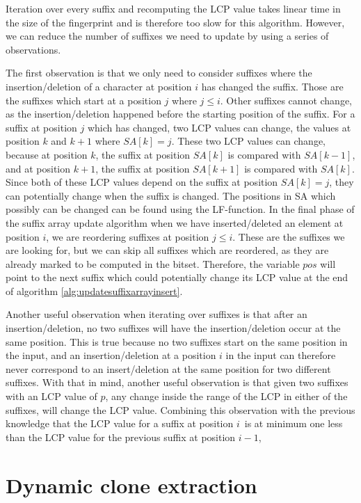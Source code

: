 Iteration over every suffix and recomputing the LCP value takes linear time in the size of
the fingerprint and is therefore too slow for this algorithm. However, we can reduce the
number of suffixes we need to update by using a series of observations.

The first observation is that we only need to consider suffixes where the
insertion/deletion of a character at position $i$ has changed the suffix. Those are the
suffixes which start at a position $j$ where $j \leq i$. Other suffixes cannot change, as
the insertion/deletion happened before the starting position of the suffix. For a suffix
at position $j$ which has changed, two LCP values can change, the values at position $k$
and $k + 1$ where $SA[k] = j$. These two LCP values can change, because at position $k$,
the suffix at position $SA[k]$ is compared with $SA[k - 1]$, and at position $k + 1$, the
suffix at position $SA[k + 1]$ is compared with $SA[k]$. Since both of these LCP values
depend on the suffix at position $SA[k] = j$, they can potentially change when the suffix
is changed. The positions in SA which possibly can be changed can be found using the
LF-function. In the final phase of the suffix array update algorithm when we have
inserted/deleted an element at position $i$, we are reordering suffixes at position $j
\leq i$. These are the suffixes we are looking for, but we can skip all suffixes which are
reordered, as they are already marked to be computed in the bitset. Therefore, the
variable $pos$ will point to the next suffix which could potentially change its
LCP value at the end of algorithm \ref{alg:updatesuffixarrayinsert}.

Another useful observation when iterating over suffixes is that after an
insertion/deletion, no two suffixes will have the insertion/deletion occur at the same
position. This is true because no two suffixes start on the same position in the input,
and an insertion/deletion at a position $i$ in the input can therefore never correspond to
an insert/deletion at the same position for two different suffixes. With that in mind,
another useful observation is that given two suffixes with an LCP value of $p$, any change
inside the range of the LCP in either of the suffixes, will change the LCP value.
Combining this observation with the previous knowledge that the LCP value for a suffix at
position $i$ is at minimum one less than the LCP value for the previous suffix at position
$i - 1$, 

\section{Dynamic clone extraction}
